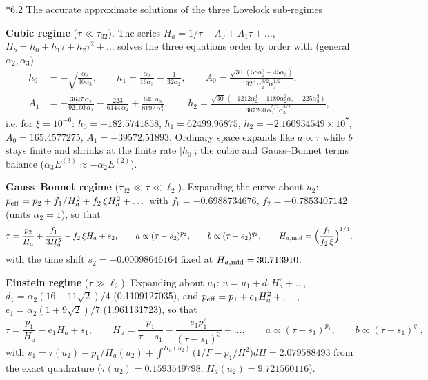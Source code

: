 \documentclass[10pt,a4paper]{article}
\makeatletter
\renewcommand\subsection{\@startsection{subsection}{2}{\z@}{-3.25ex\@plus -1ex \@minus -.2ex}{1.5ex \@plus .2ex}{\normalfont\large\bfseries\raggedright}}
\makeatother
\begin{document}
\subsection*{6.2 The accurate approximate solutions of the three Lovelock sub-regimes}
\textbf{Cubic regime} ($\tau\ll\tau_{32}$). The series $H_a=1/\tau+A_0+A_1\tau+\dots$, $H_b=h_0+h_1\tau+h_2\tau^2+\dots$ solves the three equations order by order with (general $\alpha_2,\alpha_3$)
\begin{align*}
h_0&=-\sqrt{\frac{\alpha_2}{30\alpha_3}},\qquad h_1=\frac{\alpha_2}{16\alpha_3}-\frac1{32\alpha_2},\qquad A_0=\frac{\sqrt{30}\,(58\alpha_2^2-45\alpha_3)}{1920\,\alpha_2^{3/2}\alpha_3^{1/2}}, \\
A_1&=-\frac{3647\,\alpha_2}{92160\,\alpha_3}-\frac{223}{6144\,\alpha_2}+\frac{645\,\alpha_3}{8192\,\alpha_2^3},\qquad h_2=\frac{\sqrt{30}\,(-1212\alpha_2^4+1180\alpha_2^2\alpha_3+225\alpha_3^2)}{307200\,\alpha_2^{5/2}\alpha_3^{3/2}},
\end{align*}
i.e. for $\xi=10^{-6}$: $h_0=-182.5741858$, $h_1=62499.96875$, $h_2=-2.160934549\times10^{7}$, $A_0=165.4577275$, $A_1=-39572.51893$. Ordinary space expands like $a\propto\tau$ while $b$ stays finite and shrinks at the finite rate $|h_0|$; the cubic and Gauss–Bonnet terms balance ($\alpha_3E^{(3)}\approx-\alpha_2E^{(2)}$).

\textbf{Gauss–Bonnet regime} ($\tau_{32}\ll\tau\ll\ell_2$). Expanding the curve about $u_2$: $p_{\rm eff}=p_2+f_1/H_a^2+f_2\,\xi H_a^2+\dots$ with $f_1=-0.6988734676$, $f_2=-0.7853407142$ (units $\alpha_2=1$), so that
\begin{equation*}
\tau=\frac{p_2}{H_a}+\frac{f_1}{3H_a^3}-f_2\,\xi H_a+s_2,\qquad a\propto(\tau-s_2)^{p_2},\qquad b\propto(\tau-s_2)^{q_2},\qquad H_{a,\rm mid}=\Big(\frac{f_1}{f_2\,\xi}\Big)^{1/4},
\end{equation*}
with the time shift $s_2=-0.00098646164$ fixed at $H_{a,\rm mid}=30.713910$.

\textbf{Einstein regime} ($\tau\gg\ell_2$). Expanding about $u_1$: $u=u_1+d_1H_a^2+\dots$, $d_1=\alpha_2(16-11\sqrt2)/4$ (0.1109127035), and $p_{\rm eff}=p_1+e_1H_a^2+\dots$, $e_1=\alpha_2(1+9\sqrt2)/7$ (1.961131723), so that
\begin{equation*}
\tau=\frac{p_1}{H_a}-e_1H_a+s_1,\qquad H_a=\frac{p_1}{\tau-s_1}-\frac{e_1p_1^2}{(\tau-s_1)^3}+\dots,\qquad a\propto(\tau-s_1)^{p_1},\qquad b\propto(\tau-s_1)^{q_1},
\end{equation*}
with $s_1=\tau(u_2)-p_1/H_a(u_2)+\int_0^{H_a(u_2)}\big(1/F-p_1/H^2\big)dH=2.079588493$ from the exact quadrature ($\tau(u_2)=0.1593549798$, $H_a(u_2)=9.721560116$).
\end{document}
